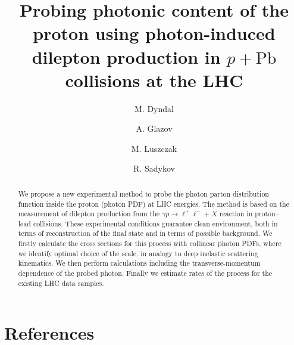 \documentclass[preprint,12pt]{revtex4}
\begin{document}
\title{Probing photonic content of the proton using photon-induced dilepton production in $p+\textrm{Pb}$ collisions at the LHC}


\author{M. Dyndal}
\address{CERN, Geneva, Switzerland}

\author{A. Glazov}
\address{Deutsches Elektronen-Synchrotron DESY, Hamburg, Germany}

\author{M. Luszczak}
\address{Faculty of Mathematics and Natural Sciences, University of Rzeszow, Poland}
\author{R. Sadykov}
\address{Joint Institute for Nuclear Research (JINR), Dubna, Russia}



\begin{abstract}
We propose a new experimental method to probe the photon parton distribution function inside the proton (photon PDF) at LHC energies.
The method is based on the measurement of dilepton production from the $\gamma p\rightarrow\ell^+\ell^-+X$ reaction in proton--lead collisions. These experimental conditions guarantee clean environment, both in terms of reconstruction of the final state and in terms of possible background.
We firstly calculate the cross sections for this process with collinear photon PDFs, where we identify optimal choice of the scale, in analogy to deep inelastic scattering kinematics.
We then perform calculations including the transverse-momentum dependence of the probed photon.
Finally we estimate rates of the process for the existing LHC data samples.
\end{abstract}




\maketitle










\FloatBarrier




\section*{References}


\end{document}
